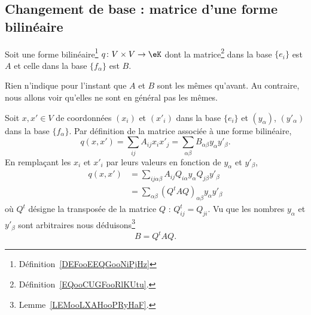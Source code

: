 \subsection{Changement de base : matrice d'une forme bilinéaire}

Soit une forme bilinéaire\footnote{Définition~\ref{DEFooEEQGooNiPjHz}} \( q\colon V\times V\to \eK\) dont la matrice\footnote{Définition~\ref{EQooCUGFooRlKUtu}.} dans la base \( \{ e_i \}\) est \( A\) et celle dans la base \( \{ f_{\alpha} \}\) est \( B\).

Rien n'indique pour l'instant que \( A\) et \( B\) sont les mêmes qu'avant. Au contraire, nous allons voir qu'elles ne sont en général pas les mêmes.

Soit \( x,x'\in V\) de coordonnées \( (x_i)\) et \( (x'_i)\) dans la base \( \{ e_i \}\) et \( (y_{\alpha})\), \( (y'_{\alpha})\) dans la base \( \{ f_{\alpha} \}\). Par définition de la matrice associée à une forme bilinéaire,
\begin{equation}
    q(x,x')=\sum_{ij}A_{ij}x_ix'_j=\sum_{\alpha\beta}B_{\alpha\beta}y_{\alpha}y'_{\beta}.
\end{equation}
En remplaçant les \( x_i\) et \( x'_i\) par leurs valeurs en fonction de \( y_{\alpha}\) et \( y'_{\beta}\),
\begin{subequations}
    \begin{align}
        q(x,x')&=\sum_{ij\alpha\beta}A_{ij}Q_{i\alpha}y_{\alpha}Q_{j\beta}y'_{\beta}\\
        &=\sum_{\alpha\beta}(Q^tAQ)_{\alpha\beta}y_{\alpha}y'_{\beta}
    \end{align}
\end{subequations}
où \( Q^t\) désigne la transposée de la matrice \( Q\) :  \( Q^t_{ij}=Q_{ji}\). Vu que les nombres \( y_{\alpha}\) et \( y'_{\beta}\) sont arbitraires nous déduisons\footnote{Lemme~\ref{LEMooLXAHooPRyHaF}.}
\begin{equation}        \label{EQooZUVTooKjqnJj}
    B=Q^tAQ.
\end{equation}

